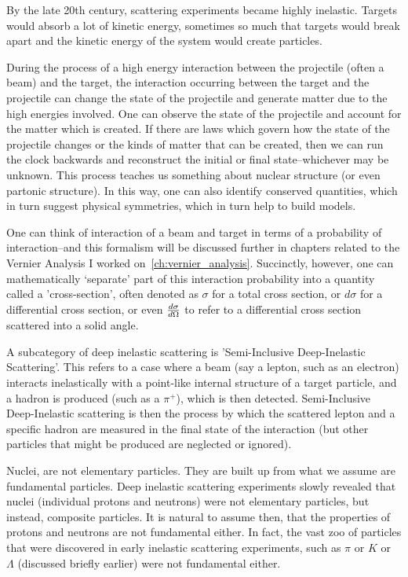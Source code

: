 By the late 20th century, scattering experiments became highly inelastic.
Targets would absorb a lot of kinetic energy, sometimes so much that targets
would break apart and the kinetic energy of the system would create particles.

During the process of a high energy interaction between the projectile (often a
beam) and the target, the interaction occurring between the target and the
projectile can change the state of the projectile and generate matter due to the
high energies involved. One can observe the state of the projectile and account
for the matter which is created. If there are laws which govern how the state of
the projectile changes or the kinds of matter that can be created, then we can
run the clock backwards and reconstruct the initial or final state--whichever
may be unknown. This process teaches us something about nuclear structure (or
even partonic structure). In this way, one can also identify conserved
quantities, which in turn suggest physical symmetries, which in turn help to
build models.

One can think of interaction of a beam and target in terms of a probability of
interaction--and this formalism will be discussed further in chapters related to
the Vernier Analysis I worked on~\ref{ch:vernier_analysis}. Succinctly, however,
one can mathematically `separate' part of this interaction probability into a
quantity called a 'cross-section', often denoted as $\sigma$ for a total cross
section, or $d\sigma$ for a differential cross section, or even
${d\sigma}\over{d\Omega}$ to refer to a differential cross section scattered
into a solid angle. 

A subcategory of deep inelastic scattering is 'Semi-Inclusive Deep-Inelastic
Scattering'. This refers to a case where a beam (say a lepton, such as an
electron) interacts inelastically with a point-like internal structure of a
target particle, and a hadron is produced (such as a $\pi^+$), which is then
detected. Semi-Inclusive Deep-Inelastic scattering is then the process by which
the scattered lepton and a specific hadron are measured in the final state of
the interaction (but other particles that might be produced are neglected or
ignored).

Nuclei, are not elementary particles. They are built up from what we assume are
fundamental particles. Deep inelastic scattering experiments slowly revealed
that nuclei (individual protons and neutrons) were not elementary particles, but
instead, composite particles.  It is natural to assume then, that the properties
of protons and neutrons are not fundamental either.  In fact, the vast zoo of
particles that were discovered in early inelastic scattering experiments, such
as $\pi$ or $K$ or $\Lambda$ (discussed briefly earlier) were not fundamental
either.

